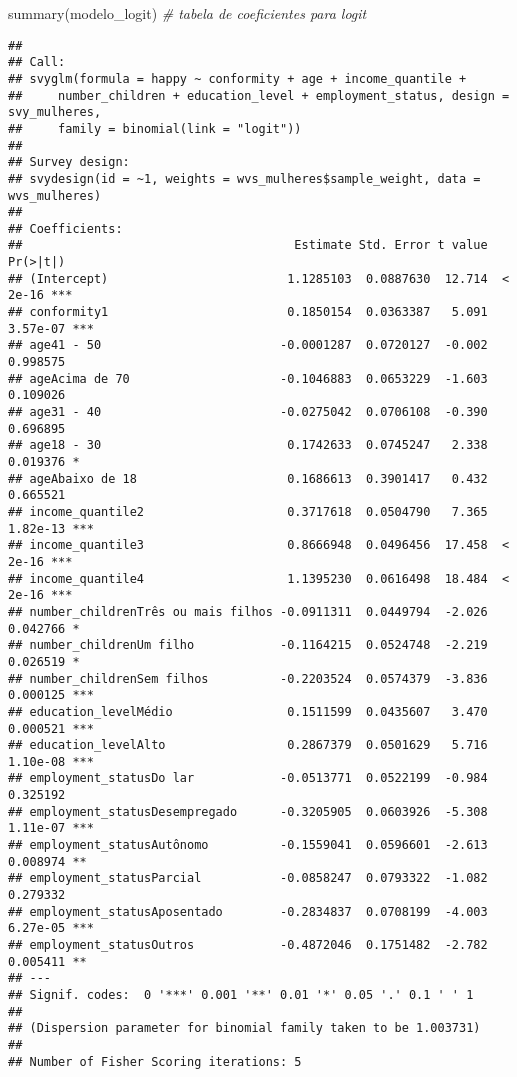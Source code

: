 \documentclass[
]{article}
\newenvironment{Shaded}{\begin{snugshade}}{\end{snugshade}}
\newcommand{\CommentTok}[1]{\textcolor[rgb]{0.56,0.35,0.01}{\textit{#1}}}
\newcommand{\FunctionTok}[1]{\textcolor[rgb]{0.00,0.00,0.00}{#1}}
\newcommand{\NormalTok}[1]{#1}
\begin{document}
\begin{Shaded}
\begin{Highlighting}[]
\FunctionTok{summary}\NormalTok{(modelo\_logit) }\CommentTok{\# tabela de coeficientes para logit}
\end{Highlighting}
\end{Shaded}

\begin{verbatim}
## 
## Call:
## svyglm(formula = happy ~ conformity + age + income_quantile + 
##     number_children + education_level + employment_status, design = svy_mulheres, 
##     family = binomial(link = "logit"))
## 
## Survey design:
## svydesign(id = ~1, weights = wvs_mulheres$sample_weight, data = wvs_mulheres)
## 
## Coefficients:
##                                      Estimate Std. Error t value Pr(>|t|)    
## (Intercept)                         1.1285103  0.0887630  12.714  < 2e-16 ***
## conformity1                         0.1850154  0.0363387   5.091 3.57e-07 ***
## age41 - 50                         -0.0001287  0.0720127  -0.002 0.998575    
## ageAcima de 70                     -0.1046883  0.0653229  -1.603 0.109026    
## age31 - 40                         -0.0275042  0.0706108  -0.390 0.696895    
## age18 - 30                          0.1742633  0.0745247   2.338 0.019376 *  
## ageAbaixo de 18                     0.1686613  0.3901417   0.432 0.665521    
## income_quantile2                    0.3717618  0.0504790   7.365 1.82e-13 ***
## income_quantile3                    0.8666948  0.0496456  17.458  < 2e-16 ***
## income_quantile4                    1.1395230  0.0616498  18.484  < 2e-16 ***
## number_childrenTrês ou mais filhos -0.0911311  0.0449794  -2.026 0.042766 *  
## number_childrenUm filho            -0.1164215  0.0524748  -2.219 0.026519 *  
## number_childrenSem filhos          -0.2203524  0.0574379  -3.836 0.000125 ***
## education_levelMédio                0.1511599  0.0435607   3.470 0.000521 ***
## education_levelAlto                 0.2867379  0.0501629   5.716 1.10e-08 ***
## employment_statusDo lar            -0.0513771  0.0522199  -0.984 0.325192    
## employment_statusDesempregado      -0.3205905  0.0603926  -5.308 1.11e-07 ***
## employment_statusAutônomo          -0.1559041  0.0596601  -2.613 0.008974 ** 
## employment_statusParcial           -0.0858247  0.0793322  -1.082 0.279332    
## employment_statusAposentado        -0.2834837  0.0708199  -4.003 6.27e-05 ***
## employment_statusOutros            -0.4872046  0.1751482  -2.782 0.005411 ** 
## ---
## Signif. codes:  0 '***' 0.001 '**' 0.01 '*' 0.05 '.' 0.1 ' ' 1
## 
## (Dispersion parameter for binomial family taken to be 1.003731)
## 
## Number of Fisher Scoring iterations: 5
\end{verbatim}
\end{document}
